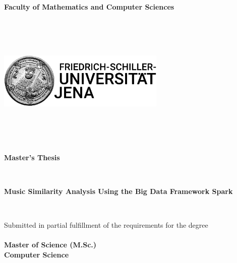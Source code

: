 \documentclass[a4paper,oneside,12pt]{report}
\begin{document}
\pagestyle{empty} %




\begin{center}
\textbf{Faculty of Mathematics and Computer Sciences\\}
\end{center}
\ \\
\ \\
\ \\
\begin{minipage}{\textwidth}
	\centering
		\includegraphics[width=0.60\textwidth]{Images/Logo_fsu.jpg}
		\label{fig:Javaterm}
\end{minipage}
\ \\
\ \\
\ \\
\begin{center}
\begin{Large}
\textbf{Master's Thesis\\}
\end{Large}
\end{center}
\ \\
\begin{center}
\begin{LARGE}
\textbf{Music Similarity Analysis Using the Big Data Framework Spark}
\end{LARGE}
\end{center}
\ \\
\begin{center}
Submitted in partial fulfillment of the requirements for the degree\\
\ \\
\textbf{Master of Science (M.Sc.)\\}
\textbf{Computer Science\\}
\end{center}
\end{document}
